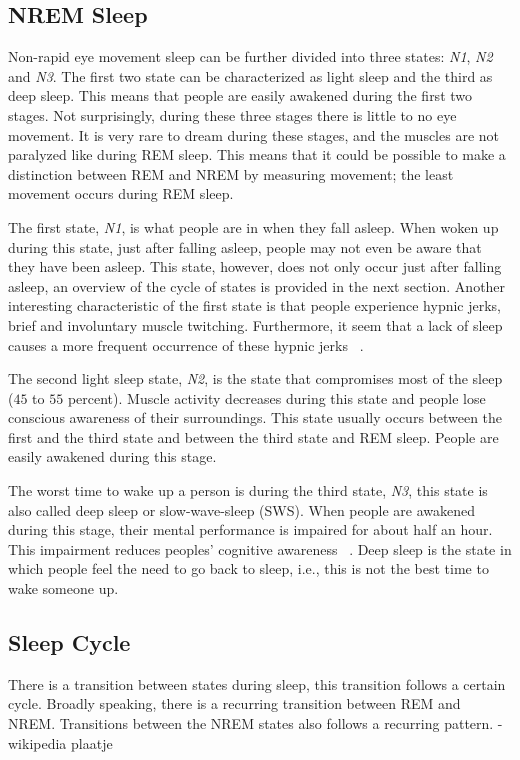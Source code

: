 \subsection{NREM Sleep} %
\label{sub:non_rem_sleep}
Non-rapid eye movement sleep can be further divided into three states: \emph{N1}, \emph{N2} and \emph{N3}. The first two state can be characterized as light sleep and the third as deep sleep. This means that people are easily awakened during the first two stages. Not surprisingly, during these three stages there is little to no eye movement. It is very rare to dream during these stages, and the muscles are not paralyzed like during REM sleep. This means that it could be possible to make a distinction between REM and NREM by measuring movement; the least movement occurs during REM sleep.

The first state, \emph{N1}, is what people are in when they fall asleep. When woken up during this state, just after falling asleep, people may not even be aware that they have been asleep. This state, however, does not only occur just after falling asleep, an overview of the cycle of states is provided in the next section. Another interesting characteristic of the first state is that people experience hypnic jerks, brief and involuntary muscle twitching. Furthermore, it seem that a lack of sleep causes a more frequent occurrence of these hypnic jerks ~\cite{Sander:1998:J-Neurol-Neurosurg-Psychiatry:9598699}.

The second light sleep state, \emph{N2}, is the state that compromises most of the sleep ($45$ to $55$ percent). Muscle activity decreases during this state and people lose conscious awareness of their surroundings. This state usually occurs between the first and the third state and between the third state and REM sleep. People are easily awakened during this stage.

The worst time to wake up a person is during the third state, \emph{N3}, this state is also called deep sleep or slow-wave-sleep (SWS). When people are awakened during this stage, their mental performance is impaired for about half an hour. This impairment reduces peoples' cognitive awareness ~\cite{Tassi2000341}.
Deep sleep is the state in which people feel the need to go back to sleep, i.e., this is not the best time to wake someone up.

\subsection{Sleep Cycle} %
\label{sub:sleep_cycle}
There is a transition between states during sleep, this transition follows a certain cycle. Broadly speaking, there is a recurring transition between REM and NREM. Transitions between the NREM states also follows a recurring pattern.
- wikipedia plaatje

